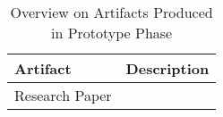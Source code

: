 
\begin{table}[H]
  \label{tbl:phase-3-artifacts}
  \caption{Overview on Artifacts Produced in Prototype Phase}

  \begin{tabular}{|l|l|}
    \hline
    \bf{Artifact}       & \bf{Description} \\ \hline
    Research Paper      &                  \\ \hline
  \end{tabular}

\end{table}
